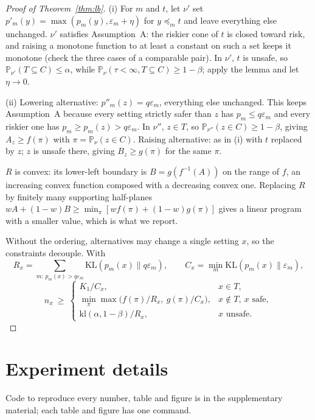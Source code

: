 \documentclass{article}
\newcommand{\eps}{\varepsilon}
\newcommand{\KL}{\mathrm{KL}}
\newcommand{\kl}{\mathrm{kl}}
\newcommand{\preceqm}{\preceq_m}
\renewcommand{\P}{\mathbb{P}}
\begin{document}
\begin{proof}[Proof of Theorem~\ref{thm:lb}]
(i) For $m$ and $t$, let $\nu'$ set $p'_m(y)=\max(p_m(y),\eps_m+\eta)$ for
$y\preceqm t$ and leave everything else unchanged. $\nu'$ satisfies
Assumption~A: the riskier cone of $t$ is closed toward risk, and raising a
monotone function to at least a constant on such a set keeps it monotone
(check the three cases of a comparable pair). In $\nu'$, $t$ is unsafe, so
$\P_{\nu'}(T\subseteq C)\le\alpha$, while
$\P_\nu(\tau<\infty,T\subseteq C)\ge1-\beta$; apply the lemma and let
$\eta\to0$.

(ii) Lowering alternative: $p''_m(z)=q\eps_m$, everything else unchanged.
This keeps Assumption~A because every setting strictly safer than $z$ has
$p_m\le q\eps_m$ and every riskier one has $p_m\ge p_m(z)>q\eps_m$. In
$\nu''$, $z\in T$, so $\P_{\nu''}(z\in C)\ge1-\beta$, giving
$A_z\ge f(\pi)$ with $\pi=\P_\nu(z\in C)$. Raising alternative: as in (i)
with $t$ replaced by $z$; $z$ is unsafe there, giving $B_z\ge g(\pi)$ for
the same $\pi$.

$R$ is convex: its lower-left boundary is $B=g(f^{-1}(A))$ on the range
of $f$, an increasing convex function composed with a decreasing convex
one. Replacing $R$ by finitely many supporting half-planes
$wA+(1-w)B\ge\min_\pi[wf(\pi)+(1-w)g(\pi)]$ gives a linear program with a
smaller value, which is what we report.

Without the ordering, alternatives may change a single setting $x$, so the
constraints decouple. With
\[
R_x=\sum_{m:\,p_m(x)>q\eps_m}\KL(p_m(x)\|q\eps_m),\qquad
C_x=\min_m\KL(p_m(x)\|\eps_m),
\]
\[
n_x\ \ge\ \begin{cases}
K_1/C_x, & x\in T,\\
\min_\pi\max\bigl(f(\pi)/R_x,\ g(\pi)/C_x\bigr), & x\notin T,\ x\text{ safe},\\
\kl(\alpha,1-\beta)/R_x, & x\text{ unsafe}.
\end{cases}
\]
\end{proof}


\section{Experiment details}\label{app:exp}

Code to reproduce every number, table and figure is in the supplementary
material; each table and figure has one command.
\end{document}

